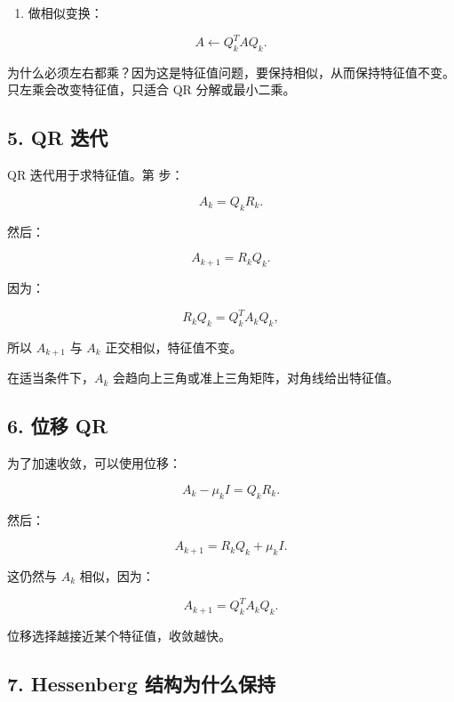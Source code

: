 \documentclass[11pt,a4paper]{ctexart}
\newcommand{\code}[1]{\begingroup\ttfamily\small #1\endgroup}
\begin{document}
\begin{enumerate}

\item 做相似变换：

\end{enumerate}

\[
A\leftarrow Q_k^TAQ_k.
\]

为什么必须左右都乘？因为这是特征值问题，要保持相似，从而保持特征值不变。只左乘会改变特征值，只适合 QR 分解或最小二乘。


\subsection*{5. QR 迭代}


QR 迭代用于求特征值。第 \code{} 步：

\[
A_k=Q_kR_k.
\]

然后：

\[
A_{k+1}=R_kQ_k.
\]

因为：

\[
R_kQ_k=Q_k^TA_kQ_k,
\]

所以 $A_{k+1}$ 与 $A_k$ 正交相似，特征值不变。

在适当条件下，$A_k$ 会趋向上三角或准上三角矩阵，对角线给出特征值。


\subsection*{6. 位移 QR}


为了加速收敛，可以使用位移：

\[
A_k-\mu_k I=Q_kR_k.
\]

然后：

\[
A_{k+1}=R_kQ_k+\mu_k I.
\]

这仍然与 $A_k$ 相似，因为：

\[
A_{k+1}=Q_k^TA_kQ_k.
\]

位移选择越接近某个特征值，收敛越快。


\subsection*{7. Hessenberg 结构为什么保持}
\end{document}
